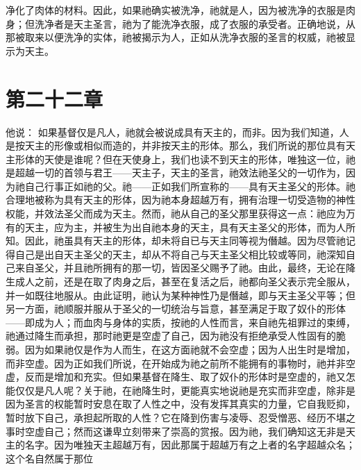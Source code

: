 净化了肉体的材料。因此，如果祂确实被洗净，祂就是人，因为被洗净的衣服是肉身；但洗净者是天主圣言，祂为了能洗净衣服，成了衣服的承受者。正确地说，从那被取来以便洗净的实体，祂被揭示为人，正如从洗净衣服的圣言的权威，祂被显示为天主。\par


\section{第二十二章}

\par

 他说： 如果基督仅是凡人，祂就会被说成具有天主的，而非。因为我们知道，人是按天主的形像或相似而造的，并非按天主的形体。那么，我们所说的那位具有天主形体的天使是谁呢？但在天使身上，我们也读不到天主的形体，唯独这一位，祂是超越一切的首领与君王——天主子，天主的圣言，祂效法祂圣父的一切作为，因为祂自己行事正如祂的父。祂——正如我们所宣称的——具有天主圣父的形体。祂合理地被称为具有天主的形体，因为祂本身超越万有，拥有治理一切受造物的神性权能，并效法圣父而成为天主。然而，祂从自己的圣父那里获得这一点：祂应为万有的天主，应为主，并被生为出自祂本身的天主，具有天主圣父的形体，而为人所知。因此，祂虽具有天主的形体，却未将自已与天主同等视为僭越。因为尽管祂记得自己是出自天主圣父的天主，却从不将自己与天主圣父相比较或等同，祂深知自己来自圣父，并且祂所拥有的那一切，皆因圣父赐予了祂。由此，最终，无论在降生成人之前，还是在取了肉身之后，甚至在复活之后，祂都向圣父表示完全服从，并一如既往地服从。由此证明，祂认为某种神性乃是僭越，即与天主圣父平等；但另一方面，祂顺服并服从于圣父的一切统治与旨意，甚至满足于取了奴仆的形体——即成为人；而血肉与身体的实质，按祂的人性而言，来自祂先祖罪过的束缚，祂通过降生而承担，那时祂更是空虚了自己，因为祂没有拒绝承受人性固有的脆弱。因为如果祂仅是作为人而生，在这方面祂就不会空虚；因为人出生时是增加，而非空虚。因为正如我们所说，在开始成为祂之前所不能拥有的事物时，祂并非空虚，反而是增加和充实。但如果基督在降生、取了奴仆的形体时是空虚的，祂又怎能仅仅是凡人呢？关于祂，在祂降生时，更能真实地说祂是充实而非空虚，除非是因为圣言的权能暂时安息在取了人性之中，没有发挥其真实的力量，它自我贬抑，暂时放下自己，承担起所取的人性？它在降到伤害与凌辱、忍受憎恶、经历不堪之事时空虚自己；然而这谦卑立刻带来了崇高的赏报。因为祂，我们确知这无非是天主的名字。因为唯独天主超越万有，因此那属于超越万有之上者的名字超越众名；这个名自然属于那位